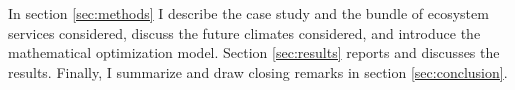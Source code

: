 In section \ref{sec:methods} I describe the case study and the bundle of ecosystem services considered, discuss the future climates considered, and introduce the mathematical optimization model. Section \ref{sec:results} reports and discusses the results. Finally, I summarize and draw closing remarks in section \ref{sec:conclusion}.
%
%
%
%
%
%
%
%

